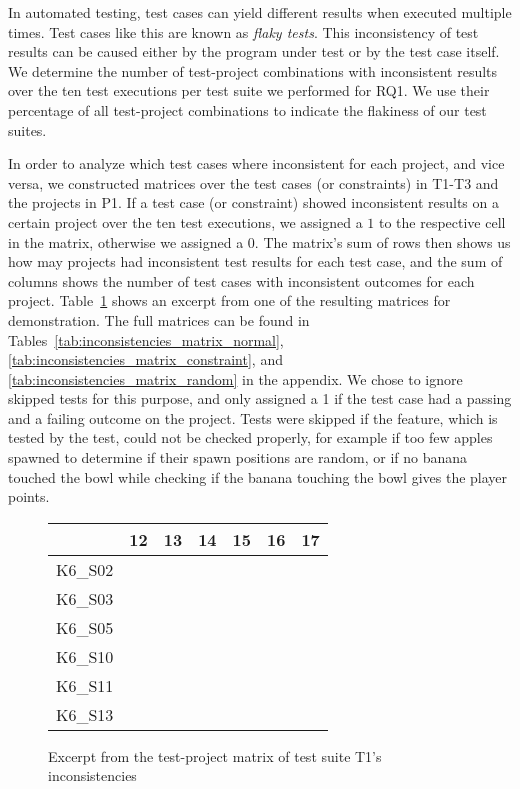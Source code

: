 \noindent In automated testing, test cases can yield different results when executed multiple times.
Test cases like this are known as \textit{flaky tests}.
This inconsistency of test results can be caused either by the program under test or by the test case itself.
We determine the number of test-project combinations with inconsistent results over the ten test executions per test suite we performed for RQ1.
We use their percentage of all test-project combinations to indicate the flakiness of our test suites.
\parspace

In order to analyze which test cases where inconsistent for each project, and vice versa,
we constructed matrices over the test cases (or constraints) in T1-T3 and the projects in P1.
If a test case (or constraint) showed inconsistent results on a certain project over the ten test executions,
we assigned a $1$ to the respective cell in the matrix, otherwise we assigned a 0.
The matrix's sum of rows then shows us how may projects had inconsistent test results for each test case,
and the sum of columns shows the number of test cases with inconsistent outcomes for each project.
Table~\ref{tab:inconsistency_matrices_excerpt} shows an excerpt from one of the resulting matrices for demonstration.
The full matrices can be found in Tables~\ref{tab:inconsistencies_matrix_normal}, \ref{tab:inconsistencies_matrix_constraint}, and \ref{tab:inconsistencies_matrix_random} in the appendix.
We chose to ignore skipped tests for this purpose,
and only assigned a 1 if the test case had a passing and a failing outcome on the project.
Tests were skipped if the feature, which is tested by the test, could not be checked properly,
for example if too few apples spawned to determine if their spawn positions are random,
or if no banana touched the bowl while checking if the banana touching the bowl gives the player points.
\parspace

\begin{figure}[htpb]
    \centering

    \setlength{\tabcolsep}{0.2em}
    \tiny
    \begin{tabular}{l|rrrrrr}
        \toprule
                & 12 & 13 & 14 & 15 & 16 & 17 \\
        \midrule
        K6\_S02 & \n & \e & \n & \n & \n & \n \\
        K6\_S03 & \n & \e & \n & \n & \n & \n \\
        K6\_S05 & \n & \n & \n & \n & \n & \n \\
        K6\_S10 & \n & \e & \e & \n & \n & \n \\
        K6\_S11 & \n & \n & \n & \n & \n & \n \\
        K6\_S13 & \n & \n & \n & \n & \n & \n \\
        \bottomrule
    \end{tabular}
    \setlength{\tabcolsep}{\defaulttabcolsep}

    \caption{Excerpt from the test-project matrix of test suite T1's inconsistencies}
    \label{tab:inconsistency_matrices_excerpt}
\end{figure}

